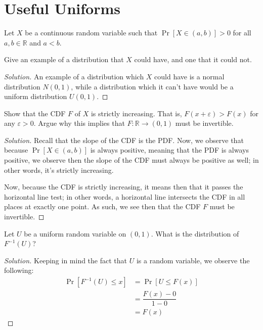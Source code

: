 \documentclass{article}
\newenvironment{solution}{\begin{proof}[Solution]}{\end{proof}}
\begin{document}
\newpage

\section{Useful Uniforms}
Let $X$ be a continuous random variable such that $\Pr[X \in (a,b)] > 0$ for all $a,b \in \mathbb{R}$ and $a < b$.

\begin{hw}
	Give an example of a distribution that $X$ could have, and one that it could not.
\end{hw}
\begin{solution}
	An example of a distribution which $X$ could have is a normal distribution $N(0,1)$, while a distribution which it can't have would be a uniform distribution $U(0,1)$.
\end{solution}

\begin{hw}
	Show that the CDF $F$ of $X$ is strictly increasing. That is, $F(x+\varepsilon) > F(x)$ for any $\varepsilon > 0$. Argue why this implies that $F: \mathbb{R} \to (0,1)$ must be invertible.
\end{hw}
\begin{solution}
	Recall that the slope of the CDF is the PDF. Now, we observe that because $\Pr[X \in (a,b)]$ is always positive, meaning that the PDF is always positive, we observe then the slope of the CDF must always be positive as well; in other words, it's strictly increasing. 
	
	Now, because the CDF is strictly increasing, it means then that it passes the horizontal line test; in other words, a horizontal line intersects the CDF in all places at exactly one point. As such, we see then that the CDF $F$ must be invertible.
\end{solution}

\begin{hw}
	Let $U$ be a uniform random variable on $(0,1)$. What is the
	distribution of $F^{-1}(U)$?
\end{hw}
\begin{solution}
	Keeping in mind the fact that $U$ is a random variable, we observe the following:
	\begin{align*}
		\Pr[F^{-1}(U) \leq x] &= \Pr[U \leq F(x)] \\
		&= \dfrac{F(x) - 0}{1 - 0} \\
		&= F(x)
	\end{align*}
\end{solution}
\end{document}
